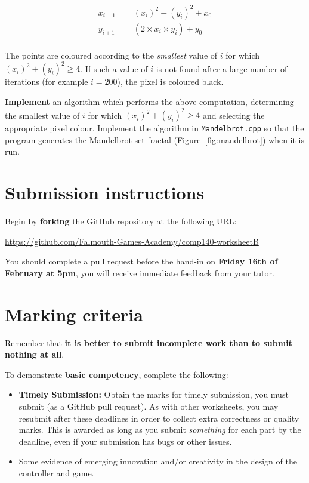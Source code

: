 \documentclass{../../../fal_assignment}
\begin{document}
\begin{align*}
x_{i+1} &= (x_i)^2 - (y_i)^2 + x_0 \\
y_{i+1} &= (2 \times x_i \times y_i) + y_0 \\
\end{align*}

The points are coloured according to the \emph{smallest} value of $i$ for which $(x_i)^2 + (y_i)^2 \geq 4$.
If such a value of $i$ is not found after a large number of iterations (for example $i=200$), the pixel is coloured black.

\textbf{Implement} an algorithm which performs the above computation, determining the smallest value of $i$
for which $(x_i)^2 + (y_i)^2 \geq 4$ and selecting the appropriate pixel colour.
Implement the algorithm in \texttt{Mandelbrot.cpp} so that the program generates the Mandelbrot set fractal (Figure~\ref{fig:mandelbrot}) when it is run.

\section*{Submission instructions}

Begin by \textbf{forking} the GitHub repository at the following URL:

\url{https://github.com/Falmouth-Games-Academy/comp140-worksheetB}

You should complete a pull request before the hand-in on \textbf{Friday 16th of February at 5pm}, you will receive immediate feedback from your tutor. 
	
\section*{Marking criteria}
	
	Remember that \textbf{it is better to submit incomplete work than to submit nothing at all}. 
	
	To demonstrate \textbf{basic competency}, complete the following:
	\begin{itemize}
		\item \textbf{Timely Submission:} Obtain the marks for timely submission, you must submit (as a GitHub pull request).
		As with other worksheets, you may resubmit after these deadlines in order to collect extra correctness or quality marks.
		This is awarded as long as you submit \emph{something} for each part by the deadline,
		even if your submission has bugs or other issues.
		\item Some evidence of emerging innovation and/or creativity in the design of the controller and game.
	\end{itemize} 
	
\end{document}
